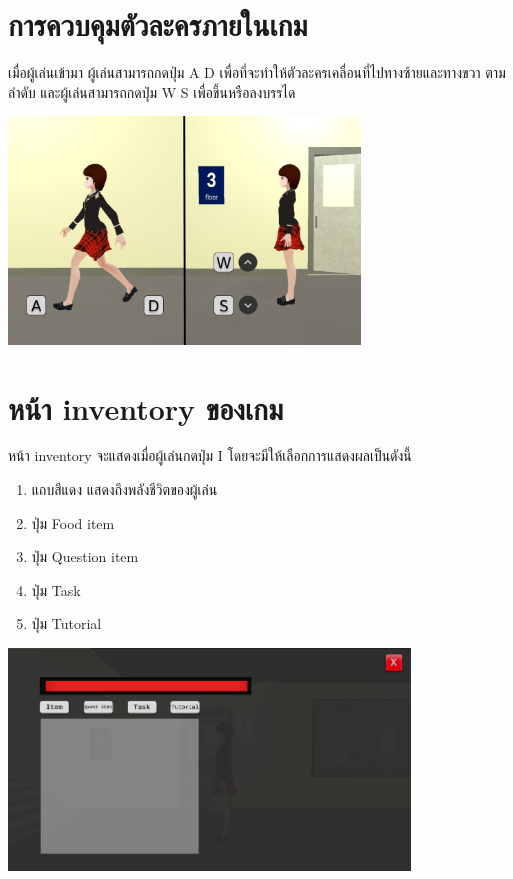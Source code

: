 \section*{การควบคุมตัวละครภายในเกม}
เมื่อผู้เล่นเข้ามา ผู้เล่นสามารถกดปุ่ม A D เพื่อที่จะทำให้ตัวละครเคลื่อนที่ไปทางซ้ายและทางขวา ตามลำดับ และผู้เล่นสามารถกดปุ่ม W S เพื่อขึ้นหรือลงบรรได
\begin{center}
    \includegraphics[width=0.7\textwidth, height=0.25\textheight]{Images/tutorial_move.png}
\end{center}

\section*{หน้า inventory ของเกม}
หน้า inventory จะแสดงเมื่อผู้เล่นกดปุ่ม I โดยจะมีให้เลือกการแสดงผลเป็นดังนี้
    \begin{enumerate}
        \item แถบสีแดง แสดงถึงพลังชีวิตของผู้เล่น
        \item ปุ่ม Food item
        \item ปุ่ม Question item
        \item ปุ่ม Task
        \item ปุ่ม Tutorial
    \end{enumerate}
    \begin{center}
        \includegraphics[width=0.8\textwidth, height=0.25\textheight]{Images/Inventory Image.png}
    \end{center}
